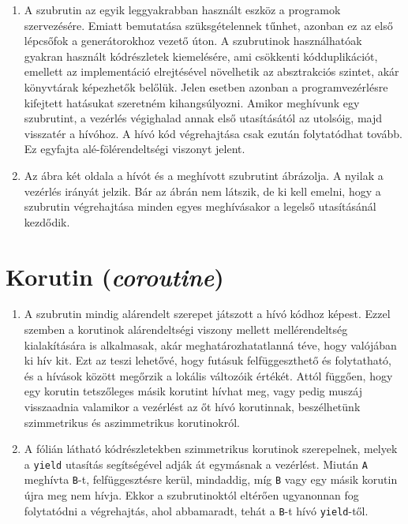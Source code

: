 \documentclass[12pt, a4paper]{article}
\begin{document}
\begin{enumerate}
\item
A szubrutin az egyik leggyakrabban használt eszköz a programok szervezésére. Emiatt bemutatása szüksgételennek tűnhet, azonban ez az első lépcsőfok a generátorokhoz vezető úton. A szubrutinok használhatóak gyakran használt kódrészletek kiemelésére, ami csökkenti kódduplikációt, emellett az implementáció elrejtésével növelhetik az absztrakciós szintet, akár könyvtárak képezhetők belőlük. Jelen esetben azonban a programvezérlésre kifejtett hatásukat szeretném kihangsúlyozni. Amikor meghívunk egy szubrutint, a vezérlés végighalad annak első utasításától az utolsóig, majd visszatér a hívóhoz. A hívó kód végrehajtása csak ezután folytatódhat tovább. Ez egyfajta alé-fölérendeltségi viszonyt jelent.
\item
Az ábra két oldala a hívót és a meghívott szubrutint ábrázolja. A nyilak a vezérlés irányát jelzik. Bár az ábrán nem látszik, de ki kell emelni, hogy a szubrutin végrehajtása minden egyes meghívásakor a legelső utasításánál kezdődik.
\end{enumerate}

\section{Korutin (\textit{coroutine})}

\begin{enumerate}
\item
A szubrutin mindig alárendelt szerepet játszott a hívó kódhoz képest. Ezzel szemben a korutinok alárendeltségi viszony mellett mellérendeltség kialakítására is alkalmasak, akár meghatározhatatlanná téve, hogy valójában ki hív kit. Ezt az teszi lehetővé, hogy futásuk felfüggeszthető és folytatható, és a hívások között megőrzik a lokális változóik értékét. Attól függően, hogy egy korutin tetszőleges másik korutint hívhat meg, vagy pedig muszáj visszaadnia valamikor a vezérlést az őt hívó korutinnak, beszélhetünk szimmetrikus és aszimmetrikus korutinokról.
\item
A fólián látható kódrészletekben szimmetrikus korutinok szerepelnek, melyek a \texttt{yield} utasítás segítségével adják át egymásnak a vezérlést. Miután \texttt{A} meghívta \texttt{B}-t, felfüggesztésre kerül, mindaddig, míg \texttt{B} vagy egy másik korutin újra meg nem hívja. Ekkor a szubrutinoktól eltérően ugyanonnan fog folytatódni a végrehajtás, ahol abbamaradt, tehát a \texttt{B}-t hívó \texttt{yield}-től.
\end{enumerate}
\end{document}
